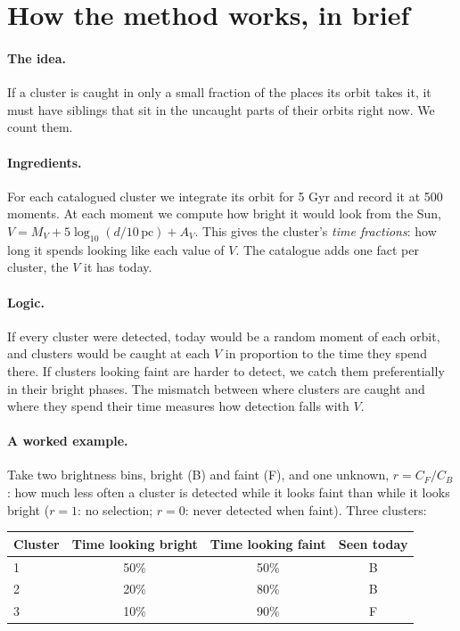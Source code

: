 \documentclass[11pt,a4paper]{article}
\newcommand{\MV}{M_V}
\begin{document}
\section{How the method works, in brief}
\label{sec:brief}

\paragraph{The idea.} If a cluster is caught in only a small fraction of the places its orbit takes
it, it must have siblings that sit in the uncaught parts of their orbits right now. We count them.

\paragraph{Ingredients.} For each catalogued cluster we integrate its orbit for 5 Gyr and record it at
500 moments. At each moment we compute how bright it would look from the Sun,
$V = \MV + 5\log_{10}(d/10\,\mathrm{pc}) + A_V$. This gives the cluster's \emph{time fractions}: how
long it spends looking like each value of $V$. The catalogue adds one fact per cluster, the $V$ it
has today.

\paragraph{Logic.} If every cluster were detected, today would be a random moment of each orbit, and
clusters would be caught at each $V$ in proportion to the time they spend there. If clusters
looking faint are harder to detect, we catch them preferentially in their bright phases. The mismatch
between where clusters are caught and where they spend their time measures how detection falls
with $V$.

\paragraph{A worked example.} Take two brightness bins, bright (B) and faint (F), and one unknown,
$r = C_F/C_B$: how much less often a cluster is detected while it looks faint than while it looks
bright ($r=1$: no selection; $r=0$: never detected when faint). Three clusters:

\begin{center}
\small
\begin{tabular}{lccc}
\toprule
Cluster & Time looking bright & Time looking faint & Seen today \\
\midrule
1 & 50\% & 50\% & B \\
2 & 20\% & 80\% & B \\
3 & 10\% & 90\% & F \\
\bottomrule
\end{tabular}
\end{center}
\end{document}
